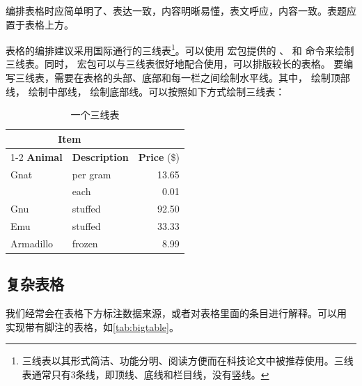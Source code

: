 编排表格时应简单明了、表达一致，内容明晰易懂，表文呼应，内容一致。表题应置于表格上方。

表格的编排建议采用国际通行的三线表\footnote{三线表以其形式简洁、功能分明、阅读方便而在科技论文中被推荐使用。三线表通常只有3条线，即顶线、底线和栏目线，没有竖线。}。可以使用  宏包提供的 、 和  命令来绘制三线表。同时， 宏包可以与三线表很好地配合使用，可以排版较长的表格。
要编写三线表，需要在表格的头部、底部和每一栏之间绘制水平线。其中， 绘制顶部线， 绘制中部线， 绘制底部线。可以按照如下方式绘制三线表：

\begin{table}[!hpt]
  \caption{一个三线表}
  \label{tab:firstone}
  \centering
  \begin{tabular}{@{}llr@{}} \toprule
    \multicolumn{2}{c}{\textbf{Item}}                            \\ \cmidrule(r){1-2}
    \textbf{Animal} & \textbf{Description} & \textbf{Price} (\$) \\ \midrule
    Gnat            & per gram             & 13.65               \\
                    & each                 & 0.01                \\
    Gnu             & stuffed              & 92.50               \\
    Emu             & stuffed              & 33.33               \\
    Armadillo       & frozen               & 8.99                \\ \bottomrule
  \end{tabular}
\end{table}

\subsection{复杂表格}

我们经常会在表格下方标注数据来源，或者对表格里面的条目进行解释。可以用
 实现带有脚注的表格，如\cref{tab:bigtable}。

